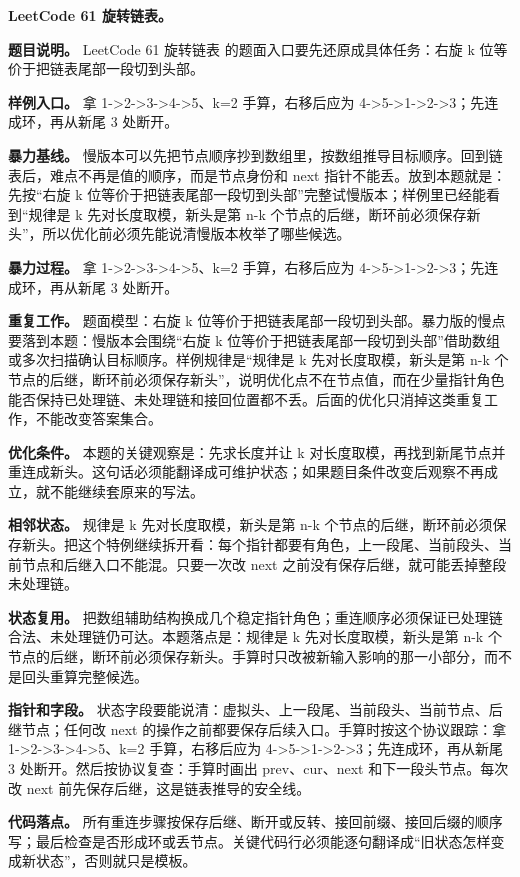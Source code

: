 \noindent\textbf{LeetCode 61 旋转链表。}

\textbf{题目说明。} LeetCode 61 旋转链表 的题面入口要先还原成具体任务：右旋 k 位等价于把链表尾部一段切到头部。

\textbf{样例入口。} 拿 1->2->3->4->5、k=2 手算，右移后应为 4->5->1->2->3；先连成环，再从新尾 3 处断开。

\textbf{暴力基线。} 慢版本可以先把节点顺序抄到数组里，按数组推导目标顺序。回到链表后，难点不再是值的顺序，而是节点身份和 next 指针不能丢。放到本题就是：先按“右旋 k 位等价于把链表尾部一段切到头部”完整试慢版本；样例里已经能看到“规律是 k 先对长度取模，新头是第 n-k 个节点的后继，断环前必须保存新头”，所以优化前必须先能说清慢版本枚举了哪些候选。

\textbf{暴力过程。} 拿 1->2->3->4->5、k=2 手算，右移后应为 4->5->1->2->3；先连成环，再从新尾 3 处断开。

\textbf{重复工作。} 题面模型：右旋 k 位等价于把链表尾部一段切到头部。暴力版的慢点要落到本题：慢版本会围绕“右旋 k 位等价于把链表尾部一段切到头部”借助数组或多次扫描确认目标顺序。样例规律是“规律是 k 先对长度取模，新头是第 n-k 个节点的后继，断环前必须保存新头”，说明优化点不在节点值，而在少量指针角色能否保持已处理链、未处理链和接回位置都不丢。后面的优化只消掉这类重复工作，不能改变答案集合。

\textbf{优化条件。} 本题的关键观察是：先求长度并让 k 对长度取模，再找到新尾节点并重连成新头。这句话必须能翻译成可维护状态；如果题目条件改变后观察不再成立，就不能继续套原来的写法。

\textbf{相邻状态。} 规律是 k 先对长度取模，新头是第 n-k 个节点的后继，断环前必须保存新头。把这个特例继续拆开看：每个指针都要有角色，上一段尾、当前段头、当前节点和后继入口不能混。只要一次改 next 之前没有保存后继，就可能丢掉整段未处理链。

\textbf{状态复用。} 把数组辅助结构换成几个稳定指针角色；重连顺序必须保证已处理链合法、未处理链仍可达。本题落点是：规律是 k 先对长度取模，新头是第 n-k 个节点的后继，断环前必须保存新头。手算时只改被新输入影响的那一小部分，而不是回头重算完整候选。

\textbf{指针和字段。} 状态字段要能说清：虚拟头、上一段尾、当前段头、当前节点、后继节点；任何改 next 的操作之前都要保存后续入口。手算时按这个协议跟踪：拿 1->2->3->4->5、k=2 手算，右移后应为 4->5->1->2->3；先连成环，再从新尾 3 处断开。然后按协议复查：手算时画出 prev、cur、next 和下一段头节点。每次改 next 前先保存后继，这是链表推导的安全线。

\textbf{代码落点。} 所有重连步骤按保存后继、断开或反转、接回前缀、接回后缀的顺序写；最后检查是否形成环或丢节点。关键代码行必须能逐句翻译成“旧状态怎样变成新状态”，否则就只是模板。

